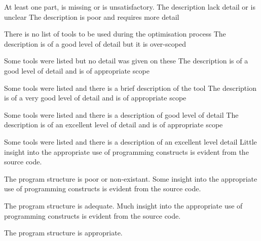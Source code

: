 \documentclass{../../fal_assignment}
\begin{document}
\rubricyeartwo
\begin{markingrubric}
		\grade\fail At least one part, is missing or is unsatisfactory.
%
        \grade \fail The description lack detail or is unclear
        \grade The description is poor and requires more detail
            \par There is no list of tools to be used during the optimisation process
        \grade The description is of a good level of detail but it is over-scoped 
            \par Some tools were listed but no detail was given on these
        \grade The description is of a good level of detail and is of appropriate scope
            \par Some tools were listed and there is a brief description of the tool
        \grade The description is of a very good level of detail and is of appropriate scope
            \par Some tools were listed and there is a description of good level of detail
        \grade The description is of an excellent level of detail and is of appropriate scope
            \par  Some tools were listed and there is a description of an excellent level detail
%
        \grade \fail Little insight into the appropriate use of programming constructs is evident from the source code.
            \par The program structure is poor or non-existant.
        \grade Some insight into the appropriate use of programming constructs is evident from the source code.
            \par The program structure is adequate.
        \grade Much insight into the appropriate use of programming constructs is evident from the source code.
            \par The program structure is appropriate.

\end{markingrubric}
\end{document}
